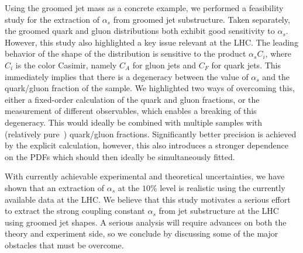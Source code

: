 \documentclass[11pt,letterpaper]{article}
\begin{document}
Using the groomed jet mass as a concrete example, we performed a feasibility study for the extraction of $\alpha_s$ from groomed jet substructure.
%
Taken separately, the groomed quark and gluon distributions both exhibit good sensitivity to $\alpha_s$.
%
However, this study also highlighted a key issue relevant at the LHC.
%
The leading behavior of the shape of the distribution is sensitive to the product $\alpha_s C_i$, where $C_i$ is the color Casimir, namely $C_A$ for gluon jets and $C_F$ for quark jets.
%
This immediately implies that there is a degeneracy between the value of $\alpha_s$ and the quark/gluon fraction of the sample.
%
We highlighted two ways of overcoming this, either a fixed-order calculation of the quark and gluon fractions, or the measurement of different observables, which enables a breaking of this degeneracy.
%
This would ideally be combined with multiple samples with (relatively pure~\cite{Gallicchio:2011xc}) quark/gluon fractions.
%
Significantly better precision is achieved by the explicit calculation, however, this also introduces a stronger dependence on the PDFs which should then ideally be simultaneously fitted.

With currently achievable experimental and theoretical uncertainties, we have shown that an extraction of $\alpha_s$ at the $10\%$ level is realistic using the currently available data at the LHC.
%
We believe that this study motivates a serious effort to extract the strong coupling constant $\alpha_s$ from jet substructure at the LHC using groomed jet shapes.
%
A serious analysis will require advances on both the theory and experiment side, so we conclude by discussing some of the major obstacles that must be overcome.
\end{document}
